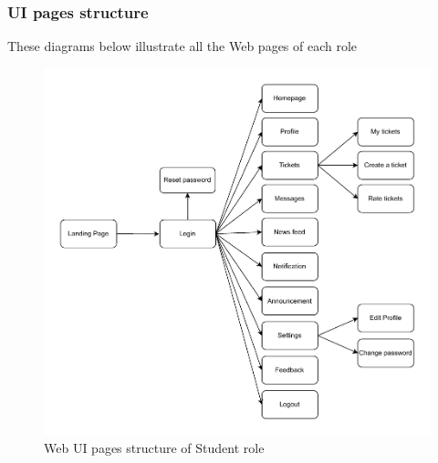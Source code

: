 	
	\subsubsection{UI pages structure}
	These diagrams below illustrate all the Web pages of each role 
	\begin{figure}[H]
		\centering
		\includegraphics[width=1\linewidth]{graphics/fe/ui-pages-std.pdf}
		\caption{Web UI pages structure of Student role}
		\label{fig:fe-ui-page-std}
	\end{figure}
	
